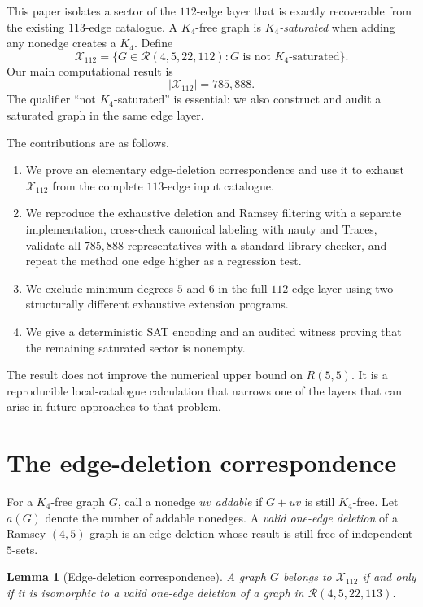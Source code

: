 \documentclass[10pt]{article}
\newtheorem{lemma}[theorem]{Lemma}
\theoremstyle{definition}
\theoremstyle{remark}
\newcommand{\Rcal}{\mathcal{R}}
\newcommand{\Xcal}{\mathcal{X}}
\begin{document}
This paper isolates a sector of the $112$-edge layer that is exactly
recoverable from the existing $113$-edge catalogue.  A $K_4$-free graph is
\emph{$K_4$-saturated} when adding any nonedge creates a $K_4$.  Define
\[
 \Xcal_{112}
 =\{G\in\Rcal(4,5,22,112):G\text{ is not }K_4\text{-saturated}\}.
\]
Our main computational result is
\[
 \boxed{|\Xcal_{112}|=785{,}888.}
\]
The qualifier ``not $K_4$-saturated'' is essential: we also construct and
audit a saturated graph in the same edge layer.

\begin{samepage}
The contributions are as follows.
\begin{enumerate}[leftmargin=*,itemsep=2pt]
  \item We prove an elementary edge-deletion correspondence and use it to
  exhaust $\Xcal_{112}$ from the complete $113$-edge input catalogue.
  \item We reproduce the exhaustive deletion and Ramsey filtering with a
  separate implementation, cross-check canonical labeling with nauty and
  Traces, validate all $785{,}888$ representatives with a standard-library
  checker, and repeat the method one edge higher as a regression test.
  \item We exclude minimum degrees $5$ and $6$ in the full $112$-edge layer
  using two structurally different exhaustive extension programs.
  \item We give a deterministic SAT encoding and an audited witness proving
  that the remaining saturated sector is nonempty.
\end{enumerate}
\end{samepage}

The result does not improve the numerical upper bound on $R(5,5)$.  It is a
reproducible local-catalogue calculation that narrows one of the layers that
can arise in future approaches to that problem.

\section{The edge-deletion correspondence}

For a $K_4$-free graph $G$, call a nonedge $uv$ \emph{addable} if $G+uv$
is still $K_4$-free.  Let $a(G)$ denote the number of addable nonedges.  A
\emph{valid one-edge deletion} of a Ramsey $(4,5)$ graph is an edge deletion
whose result is still free of independent $5$-sets.

\begin{lemma}[Edge-deletion correspondence]\label{lem:correspondence}
A graph $G$ belongs to $\Xcal_{112}$ if and only if it is isomorphic to a
valid one-edge deletion of a graph in $\Rcal(4,5,22,113)$.
\end{lemma}
\end{document}
